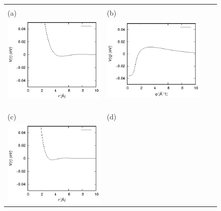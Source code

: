 \documentclass[final,12pt]{elsarticle}
\begin{document}
{\begin{table}[htp]
\begin{center}
\begin{tabular}{cccccc}
                   \\
	        \\\hline
		\end{tabular}
	\end{center}
\end{table}
\begin{figure}[htp]
\begin{center}
\begin{tabular}{llll}
\vspace{-2.0cm}
\\(a) & (b) \\
\includegraphics[width=7.4cm]{iCsBRET.eps}&
\includegraphics[width=7.4cm]{iCsFFACT.eps}\\&\\&\\
\vspace{-2.0cm}
\\(c) & (d) \\
\includegraphics[width=7.4cm]{iNaBRET.eps}&

\end{tabular}
\end{center}
\end{figure}}
\end{document}
